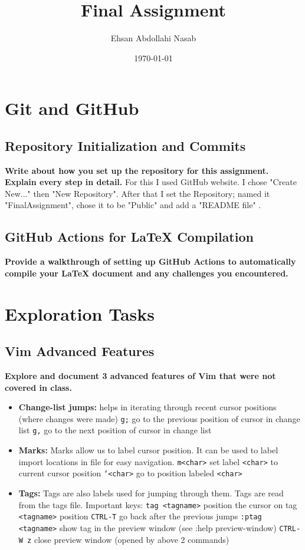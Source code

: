 \documentclass{article}
\title{Final Assignment}
\author{Ehsan Abdollahi Nasab}
\date{\today}
\begin{document}
    \maketitle

    \section{Git and GitHub}
    \subsection{Repository Initialization and Commits}
    \textbf{Write about how you set up the repository for this assignment. Explain every step in detail.}
    {\color{green}
    For this I used GitHub website. I chose "Create New..." then "New Repository". After that I set the Repository; named it "FinalAssignment", chose it to be "Public" and add a "README file"
    \color{black}.}
    \subsection{GitHub Actions for LaTeX Compilation}
    \textbf{Provide a walkthrough of setting up GitHub Actions to automatically compile your LaTeX document and any challenges you encountered.}
    {\color{green}
    \color{black}}

    \section{Exploration Tasks}
    \subsection{Vim Advanced Features}
    \textbf{Explore and document 3 advanced features of Vim that were not covered in class.}
    {\color{green}
    \begin{itemize}
        \item \textbf{Change-list jumps:} helps in iterating through recent cursor positions (where changes were made)
        \texttt{g;} go to the previous position of cursor in change list
        \texttt{g,} go to the next position of cursor in change list
        \item \textbf{Marks:} Marks allow us to label cursor position. It can be used to label import locations in file for easy navigation.
        \texttt{m<char>} set label \texttt{<char>} to current cursor position
        \texttt{`<char>} go to position labeled \texttt{<char>}
        \item \textbf{Tags:} Tags are also labels used for jumping through them. Tags are read from the tags file.
        Important keys:
        \texttt{tag <tagname>} position the cursor on tag \texttt{<tagname>} position
        \texttt{CTRL-T} go back after the previous jumps
        \texttt{:ptag <tagname>} show tag in the preview window (see :help preview-window)
        \texttt{CTRL-W z} close preview window (opened by above 2 commands)
    \end{itemize}}
    \color{black}
    
\end{document}
